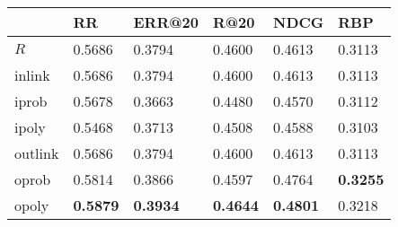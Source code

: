 \begin{tabular}{llllll}
\toprule
{} &               RR &           ERR@20 &             R@20 &             NDCG &              RBP \\
\midrule
$R$     &           0.5686 &           0.3794 &           0.4600 &           0.4613 &           0.3113 \\
inlink  &           0.5686 &           0.3794 &           0.4600 &           0.4613 &           0.3113 \\
iprob   &           0.5678 &           0.3663 &           0.4480 &           0.4570 &           0.3112 \\
ipoly   &           0.5468 &           0.3713 &           0.4508 &           0.4588 &           0.3103 \\
outlink &           0.5686 &           0.3794 &           0.4600 &           0.4613 &           0.3113 \\
oprob   &           0.5814 &           0.3866 &           0.4597 &           0.4764 &  \textbf{0.3255} \\
opoly   &  \textbf{0.5879} &  \textbf{0.3934} &  \textbf{0.4644} &  \textbf{0.4801} &           0.3218 \\
\bottomrule
\end{tabular}
